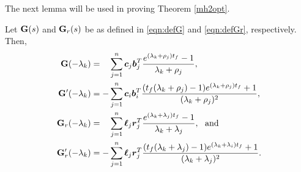 \documentclass[twocolumn]{autart}
\begin{document}
The next lemma will be used in proving Theorem \ref{mh2opt}.
\begin{Lemma}\label{mgexp}
Let $\mathbf{G}(s)$ and $\mathbf{G}_r(s)$ be as defined in \eqref{eqn:defG} and \eqref{eqn:defGr}, respectively. Then,
\begin{align}
\mathbf{G}(-\lambda_k)&=\phantom{-}\sum_{j=1}^n\boldsymbol{c}_j\boldsymbol{b}_j^T\dfrac{e^{(\lambda_k+\rho_j){t_f}}-1}{\lambda_k+\rho_j},
\label{eqn:Gatlk}\\
 \mathbf{G}'(-\lambda_k)& =-\sum_{j=1}^n\boldsymbol{c}_i\boldsymbol{b}_i^T\dfrac {({t_f} (\lambda_k+\rho_j)-1)e^{(\lambda_k+\rho_j){t_f}}+1}{(\lambda_k+\rho_j)^2}, \label{eqn:Gpatlk}  \\
 \mathbf{G}_r(-\lambda_k)&=\phantom{-}\sum_{j=1}^n\boldsymbol{\ell}_j\boldsymbol{r}_j^T\dfrac{e^{(\lambda_k+\lambda_j){t_f}}-1}{\lambda_k+\lambda_j}, ~~\mbox{and} 
\label{eqn:Gratlk}\\
 \mathbf{G}_r'(-\lambda_k)& =-\sum_{j=1}^n\boldsymbol{\ell}_j\boldsymbol{r}_j^T\dfrac {({t_f} (\lambda_k+\lambda_j)-1)e^{(\lambda_k+\lambda_i){t_f}}+1}{(\lambda_k+\lambda_j)^2}. \label{eqn:Grpatlk} 
\end{align}
\end{Lemma}
\end{document}
